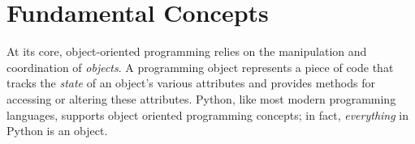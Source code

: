 \section*{Fundamental Concepts}

\begin{comment}
At its core, object oriented programming relies on the manipulation and coordination of objects.
An object represents a piece of code that tracks a state and provides methods for discovering or altering the state.


There are a few concepts that define object oriented programming

\begin{itemize}

\item Abstraction - appropriate representation of states and data

\item Encapsulation - independent behavior

\item Inheritance - relations between objects

\end{itemize}

The general advantage of using these concepts is that it helps with organizing code.
``Abstraction" permits the presentation of only necessary details about an object to the user.
For example, when we ask someone if they own a computer, we can use abstraction to ask the question ``Do you own a computer?'' rather than asking about each and every combination of hardware that we could classify as a computer.
Inheritance helps us easily achieve this abstraction.
We could have an object called \li{Computer}.
Various brands would then subclass, or inherit, the properties of \li{Computer}.
We could continue by having each product line inherit from their respective brands, until we arrive at the product level.
Then each individual product would represent an instantiation of that product's class.
Encapsulation means each function contains all of the data it needs to calculate a result.
Encapsulation is used to avoid the use of global data structures and makes managing data involved in computation more convenient.
\end{comment}

At its core, object-oriented programming relies on the manipulation and coordination of \emph{objects}.
A programming object represents a piece of code that tracks the \emph{state} of an object's various attributes and provides methods for accessing or altering these attributes.
Python, like most modern programming languages, supports object oriented programming concepts; in fact, \emph{everything} in Python is an object.

